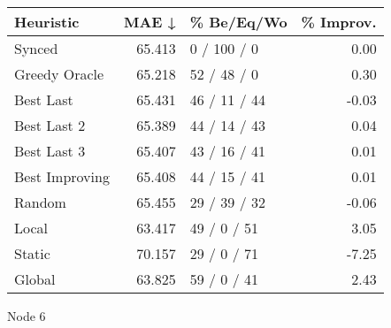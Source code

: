 \begin{tabular}{lrlr}
\toprule
\textbf{Heuristic} & \textbf{MAE ↓} & \textbf{\% Be/Eq/Wo} & \textbf{\% Improv.} \\
\midrule
            Synced &         65.413 &          0 / 100 / 0 &                0.00 \\
     Greedy Oracle &         65.218 &          52 / 48 / 0 &                0.30 \\
         Best Last &         65.431 &         46 / 11 / 44 &               -0.03 \\
       Best Last 2 &         65.389 &         44 / 14 / 43 &                0.04 \\
       Best Last 3 &         65.407 &         43 / 16 / 41 &                0.01 \\
    Best Improving &         65.408 &         44 / 15 / 41 &                0.01 \\
            Random &         65.455 &         29 / 39 / 32 &               -0.06 \\
             Local &         63.417 &          49 / 0 / 51 &                3.05 \\
            Static &         70.157 &          29 / 0 / 71 &               -7.25 \\
            Global &         63.825 &          59 / 0 / 41 &                2.43 \\
\bottomrule
\end{tabular}
\caption{Node 6}
\label{tab:iid_lr01_le1_bs2_6}
